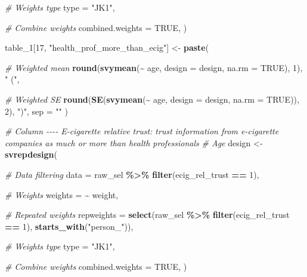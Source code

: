 \documentclass[
]{article}
\newenvironment{Shaded}{\begin{snugshade}}{\end{snugshade}}
\newcommand{\AttributeTok}[1]{\textcolor[rgb]{0.13,0.29,0.53}{#1}}
\newcommand{\CommentTok}[1]{\textcolor[rgb]{0.56,0.35,0.01}{\textit{#1}}}
\newcommand{\ConstantTok}[1]{\textcolor[rgb]{0.56,0.35,0.01}{#1}}
\newcommand{\DecValTok}[1]{\textcolor[rgb]{0.00,0.00,0.81}{#1}}
\newcommand{\FunctionTok}[1]{\textcolor[rgb]{0.13,0.29,0.53}{\textbf{#1}}}
\newcommand{\NormalTok}[1]{#1}
\newcommand{\OtherTok}[1]{\textcolor[rgb]{0.56,0.35,0.01}{#1}}
\newcommand{\SpecialCharTok}[1]{\textcolor[rgb]{0.81,0.36,0.00}{\textbf{#1}}}
\newcommand{\StringTok}[1]{\textcolor[rgb]{0.31,0.60,0.02}{#1}}
\begin{document}
\begin{Shaded}
\begin{Highlighting}[]
  \CommentTok{\# Weights type}
  \AttributeTok{type =} \StringTok{"JK1"}\NormalTok{,}
  
  \CommentTok{\# Combine weights}
  \AttributeTok{combined.weights =} \ConstantTok{TRUE}\NormalTok{,}
\NormalTok{)}
  
\NormalTok{table\_1[}\DecValTok{17}\NormalTok{, }\StringTok{"health\_prof\_more\_than\_ecig"}\NormalTok{] }\OtherTok{\textless{}{-}} \FunctionTok{paste}\NormalTok{(}
  
  \CommentTok{\# Weighted mean}
  \FunctionTok{round}\NormalTok{(}\FunctionTok{svymean}\NormalTok{(}\SpecialCharTok{\textasciitilde{}}\NormalTok{ age, }\AttributeTok{design =}\NormalTok{ design, }\AttributeTok{na.rm =} \ConstantTok{TRUE}\NormalTok{), }\DecValTok{1}\NormalTok{),}
  \StringTok{" ("}\NormalTok{,}
  
  \CommentTok{\# Weighted SE}
  \FunctionTok{round}\NormalTok{(}\FunctionTok{SE}\NormalTok{(}\FunctionTok{svymean}\NormalTok{(}\SpecialCharTok{\textasciitilde{}}\NormalTok{ age, }\AttributeTok{design =}\NormalTok{ design, }\AttributeTok{na.rm =} \ConstantTok{TRUE}\NormalTok{)), }\DecValTok{2}\NormalTok{),}
  \StringTok{")"}\NormalTok{,}
  \AttributeTok{sep =} \StringTok{""}
\NormalTok{)}


\CommentTok{\# Column {-}{-}{-}{-} E{-}cigarette relative trust: trust information from e{-}cigarette companies as much or more than health professionals}
\CommentTok{\# Age}
\NormalTok{design }\OtherTok{\textless{}{-}} \FunctionTok{svrepdesign}\NormalTok{(}
  
  \CommentTok{\# Data filtering}
  \AttributeTok{data =}\NormalTok{ raw\_sel }\SpecialCharTok{\%\textgreater{}\%} \FunctionTok{filter}\NormalTok{(ecig\_rel\_trust }\SpecialCharTok{==} \DecValTok{1}\NormalTok{),}
  
  \CommentTok{\# Weights}
  \AttributeTok{weights =} \SpecialCharTok{\textasciitilde{}}\NormalTok{ weight,}
  
  \CommentTok{\# Repeated weights}
  \AttributeTok{repweights =} \FunctionTok{select}\NormalTok{(raw\_sel }\SpecialCharTok{\%\textgreater{}\%} \FunctionTok{filter}\NormalTok{(ecig\_rel\_trust }\SpecialCharTok{==} \DecValTok{1}\NormalTok{), }\FunctionTok{starts\_with}\NormalTok{(}\StringTok{"person\_"}\NormalTok{)),}
  
  \CommentTok{\# Weights type}
  \AttributeTok{type =} \StringTok{"JK1"}\NormalTok{,}
  
  \CommentTok{\# Combine weights}
  \AttributeTok{combined.weights =} \ConstantTok{TRUE}\NormalTok{,}
\NormalTok{)}
  

\end{Highlighting}
\end{Shaded}
\end{document}
